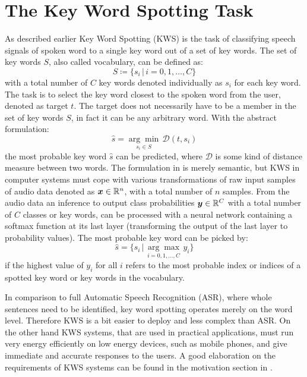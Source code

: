 
\section{The Key Word Spotting Task}\label{sec:intro_kws}
\thesisStateRevised
As described earlier Key Word Spotting (KWS) is the task of classifying speech signals of spoken word to a single key word out of a set of key words.
The set of key words $S$, also called vocabulary, can be defined as:
\begin{equation}\label{eq:intro_kws_dict}
	S \coloneqq \{s_i \, | \, i = 0, 1, \dots, C\}
\end{equation}
with a total number of $C$ key words denoted individually as $s_i$ for each key word.
The task is to select the key word closest to the spoken word from the user, denoted as target $t$.
The target does not necessarily have to be a member in the set of key words $S$, in fact it can be any arbitrary word.
With the abstract formulation:
\begin{equation}\label{eq:intro_kws_task}
	\hat{s} = \underset{s_i \in S}{\arg \min} \, \mathcal{D}(t, s_i)
\end{equation}
the most probable key word $\hat{s}$ can be predicted, where $\mathcal{D}$ is some kind of distance measure between two words.
The formulation in  is merely semantic, but KWS in computer systems must cope with various transformations of raw input samples of audio data denoted as $\bm{x} \in \mathbb{R}^n$, with a total number of $n$ samples.
From the audio data an inference to output class probabilities $\bm{y} \in \mathbb{R}^C$ with a total number of $C$ classes or key words, can be processed with a neural network containing a softmax function at its last layer (transforming the output of the last layer to probability values).
The most probable key word can be picked by:
\begin{equation}\label{eq:intro_kws_class}
	\hat{s} = \{s_i \, | \, \underset{i = 0, 1, \dots, C}{\arg \max} \, y_i\}
\end{equation}
if the highest value of $y_i$ for all $i$ refers to the most probable index or indices of a spotted key word or key words in the vocabulary.

In comparison to full Automatic Speech Recognition (ASR), where whole sentences need to be identified, key word spotting operates merely on the word level.
Therefore KWS is a bit easier to deploy and less complex than ASR.
On the other hand KWS systems, that are used in practical applications, must run very energy efficiently on low energy devices, such as mobile phones, and give immediate and accurate responses to the users. 
A good elaboration on the requirements of KWS systems can be found in the motivation section in \cite{Warden2018}.

